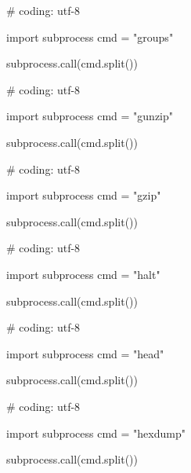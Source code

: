 \begin{mylisting}[label={lst:acpid},language=sh,caption=groups]

# coding: utf-8

import subprocess
cmd = "groups"

subprocess.call(cmd.split())

\end{mylisting}

\begin{mylisting}[label={lst:acpid},language=sh,caption=gunzip]

# coding: utf-8

import subprocess
cmd = "gunzip"

subprocess.call(cmd.split())

\end{mylisting}

\begin{mylisting}[label={lst:acpid},language=sh,caption=gzip]

# coding: utf-8

import subprocess
cmd = "gzip"

subprocess.call(cmd.split())

\end{mylisting}

\begin{mylisting}[label={lst:acpid},language=sh,caption=halt]

# coding: utf-8

import subprocess
cmd = "halt"

subprocess.call(cmd.split())

\end{mylisting}

\begin{mylisting}[label={lst:acpid},language=sh,caption=head]

# coding: utf-8

import subprocess
cmd = "head"

subprocess.call(cmd.split())

\end{mylisting}

\begin{mylisting}[label={lst:acpid},language=sh,caption=hexdump]

# coding: utf-8

import subprocess
cmd = "hexdump"

subprocess.call(cmd.split())

\end{mylisting}

